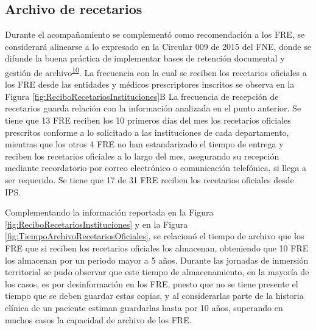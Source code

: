 \documentclass[
]{book}
\begin{document}
\hypertarget{archivo-de-recetarios}{%
\subsection{Archivo de recetarios}\label{archivo-de-recetarios}}

Durante el acompañamiento se complementó como recomendación a los FRE, se considerará alinearse a lo expresado en la Circular 009 de 2015 del FNE, donde se difunde la buena práctica de implementar bases de retención documental y gestión de archivo\textsuperscript{\protect\hyperlink{ref-FNE2015-9}{10}}. La frecuencia con la cual se reciben los recetarios oficiales a los FRE desde las entidades y médicos prescriptores inscritos se observa en la Figura \ref{fig:ReciboRecetariosInstituciones}B La frecuencia de recepción de recetarios guarda relación con la información analizada en el punto anterior. Se tiene que 13 FRE reciben los 10 primeros días del mes los recetarios oficiales prescritos conforme a lo solicitado a las instituciones de cada departamento, mientras que los otros 4 FRE no han estandarizado el tiempo de entrega y reciben los recetarios oficiales a lo largo del mes, asegurando su recepción mediante recordatorio por correo electrónico o comunicación telefónica, si llega a ser requerido. Se tiene que 17 de 31 FRE reciben los recetarios oficiales desde IPS.

Complementando la información reportada en la Figura \ref{fig:ReciboRecetariosInstituciones} y en la Figura \ref{fig:TiempoArchivoRecetariosOficiales}, se relacionó el tiempo de archivo que los FRE que si reciben los recetarios oficiales los almacenan, obteniendo que 10 FRE los almacenan por un periodo mayor a 5 años. Durante las jornadas de inmersión territorial se pudo observar que este tiempo de almacenamiento, en la mayoría de los casos, es por desinformación en los FRE, puesto que no se tiene presente el tiempo que se deben guardar estas copias, y al considerarlas parte de la historia clínica de un paciente estiman guardarlas hasta por 10 años, superando en muchos casos la capacidad de archivo de los FRE.
\end{document}

